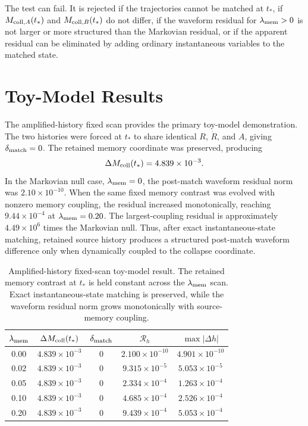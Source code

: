 \documentclass[11pt]{article}
\begin{document}
The test can fail. It is rejected if the trajectories cannot be matched at \(t_\ast\), if \(M_{{\rm coll},A}(t_\ast)\) and \(M_{{\rm coll},B}(t_\ast)\) do not differ, if the waveform residual for \(\lambda_{\rm mem}>0\) is not larger or more structured than the Markovian residual, or if the apparent residual can be eliminated by adding ordinary instantaneous variables to the matched state.

\section{Toy-Model Results}
\label{sec:toy_results}

The amplified-history fixed scan provides the primary toy-model demonstration. The two histories were forced at \(t_\ast\) to share identical \(R\), \(\dot R\), and \(A\), giving \(\delta_{\rm match}=0\). The retained memory coordinate was preserved, producing
\begin{equation}
\Delta M_{\rm coll}(t_\ast)=4.839\times10^{-3}.
\end{equation}
In the Markovian null case, \(\lambda_{\rm mem}=0\), the post-match waveform residual norm was \(2.10\times10^{-10}\). When the same fixed memory contrast was evolved with nonzero memory coupling, the residual increased monotonically, reaching \(9.44\times10^{-4}\) at \(\lambda_{\rm mem}=0.20\). The largest-coupling residual is approximately \(4.49\times10^6\) times the Markovian null. Thus, after exact instantaneous-state matching, retained source history produces a structured post-match waveform difference only when dynamically coupled to the collapse coordinate.

\begin{table}[t]
\centering
\caption{Amplified-history fixed-scan toy-model result. The retained memory contrast at \(t_\ast\) is held constant across the \(\lambda_{\rm mem}\) scan. Exact instantaneous-state matching is preserved, while the waveform residual norm grows monotonically with source-memory coupling.}
\begin{tabular}{ccccc}
\toprule
\(\lambda_{\rm mem}\) & \(\Delta M_{\rm coll}(t_\ast)\) & \(\delta_{\rm match}\) & \(\mathcal{R}_h\) & \(\max|\Delta h|\) \\
\midrule
0.00 & \(4.839\times10^{-3}\) & 0 & \(2.100\times10^{-10}\) & \(4.901\times10^{-10}\) \\
0.02 & \(4.839\times10^{-3}\) & 0 & \(9.315\times10^{-5}\) & \(5.053\times10^{-5}\) \\
0.05 & \(4.839\times10^{-3}\) & 0 & \(2.334\times10^{-4}\) & \(1.263\times10^{-4}\) \\
0.10 & \(4.839\times10^{-3}\) & 0 & \(4.685\times10^{-4}\) & \(2.526\times10^{-4}\) \\
0.20 & \(4.839\times10^{-3}\) & 0 & \(9.439\times10^{-4}\) & \(5.053\times10^{-4}\) \\
\bottomrule
\end{tabular}
\label{tab:toy_amplified_fixed_scan}
\end{table}
\end{document}
